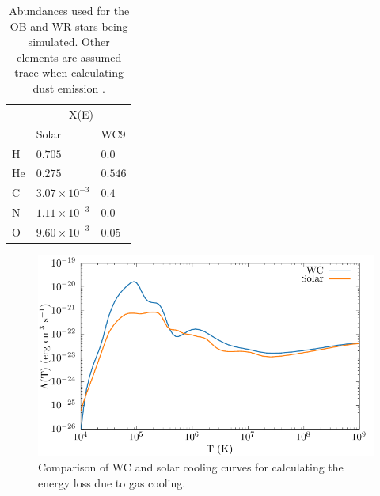 \documentclass[fleqn,usenatbib]{mnras}
\begin{document}
\begin{table}
  \centering
  \begin{tabular}{@{}lll@{}}
  \toprule
  \multicolumn{1}{l}{} & \multicolumn{2}{c}{X(E)} \\ \cmidrule(l){2-3} 
   & Solar & WC9 \\ \midrule
  H & $0.705$ & $0.0$ \\
  He & $0.275$ & $0.546$ \\
  C & $3.07 \times 10^{-3}$ & $0.4$ \\
  N & $1.11 \times 10^{-3}$ & $0.0$ \\
  O & $9.60 \times 10^{-3}$ & $0.05$ \\
  \hline
  \end{tabular}
  \caption[Abundances by mass used for OB and WR stars]{Abundances used for the OB and WR stars being simulated. Other elements are assumed trace when calculating dust emission \citep{williamsSpectraWC9Stars2015}.}
  \label{tab:abundances}
\end{table}


\begin{figure}
  \centering
  \includegraphics[width=\linewidth]{assets/cooling-curve/cooling-curve-no-elements.pdf}
  \caption[WR and OB $\Lambda(T)$ cooling curves]{Comparison of WC and solar cooling curves for calculating the energy loss due to gas cooling.}
  \label{fig:cooling-curve}
\end{figure}
\end{document}
